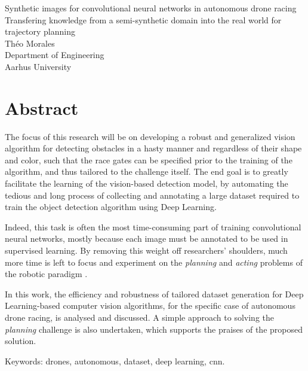 Synthetic images for convolutional neural networks in autonomous
drone racing \\
Transfering knowledge from a semi-synthetic domain into the real world for
trajectory planning\\
Théo Morales\\
Department of Engineering\\
Aarhus University \setlength{\parskip}{0.5cm}

\thispagestyle{plain}			%
\setlength{\parskip}{0pt plus 1.0pt}
\section*{Abstract}
The focus of this research will be on developing a robust and generalized
vision algorithm for detecting obstacles in a hasty manner and regardless
of their shape and color, such that the race gates can be specified prior to the
training of the algorithm, and thus tailored to the challenge itself. The end
goal is to greatly facilitate the learning of the vision-based detection model,
by automating the tedious and long process of collecting and annotating a large
dataset required to train the object detection algorithm using Deep Learning.

Indeed, this task is often the most time-consuming part of training
convolutional neural networks, mostly because each image must be annotated to be
used in supervised learning. By removing this weight off researchers' shoulders,
much more time is left to focus and experiment on the \emph{planning} and
\emph{acting} problems of the robotic paradigm .

In this work, the efficiency and robustness of tailored dataset generation for
Deep Learning-based computer vision algorithms, for the specific case of
autonomous drone racing, is analysed and discussed.
A simple approach to solving the \emph{planning} challenge is also undertaken,
which supports the praises of the proposed solution.

\vfill
Keywords: drones, autonomous, dataset, deep learning, cnn.


